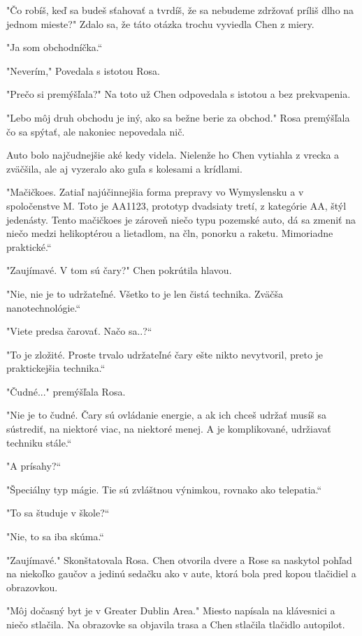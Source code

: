 \documentclass{book}
\begin{document}
"$ $Čo robíš, keď sa budeš sťahovať a tvrdíš, že sa nebudeme zdržovať príliš dlho na jednom mieste?"$ $ Zdalo sa, že táto otázka trochu vyviedla Chen z miery.

"$ $Ja som obchodníčka.“

"$ $Neverím,"$ $ Povedala s istotou Rosa.

"$ $Prečo si premýšľala?"$ $ Na toto už Chen odpovedala s istotou a bez prekvapenia.

"$ $Lebo môj druh obchodu je iný, ako sa bežne berie za obchod."$ $ Rosa premýšľala čo sa spýtať, ale nakoniec nepovedala nič. 

Auto bolo najčudnejšie aké kedy videla. Nielenže ho Chen vytiahla z vrecka a zväčšila, ale aj vyzeralo ako guľa s kolesami a krídlami.

"$ $Mačičkoes. Zatiaľ najúčinnejšia forma prepravy vo Wymyslensku a v spoločenstve M. Toto je AA1123, prototyp dvadsiaty tretí, z kategórie AA, štýl jedenásty. Tento mačičkoes je zároveň niečo typu pozemské auto, dá sa zmeniť na niečo medzi helikoptérou a lietadlom, na čln, ponorku a raketu. Mimoriadne praktické.“

"$ $Zaujímavé. V tom sú čary?"$ $ Chen pokrútila hlavou.

"$ $Nie, nie je to udržateľné. Všetko to je len čistá technika. Zväčša nanotechnológie.“

"$ $Viete predsa čarovať. Načo sa..?“

"$ $To je zložité. Proste trvalo udržateľné čary ešte nikto nevytvoril, preto je praktickejšia technika.“

"$ $Čudné..."$ $ premýšľala Rosa.

"$ $Nie je to čudné. Čary sú ovládanie energie, a ak ich chceš udržať musíš sa sústrediť, na niektoré viac, na niektoré menej. A je komplikované, udržiavať techniku stále.“

"$ $A prísahy?“

"$ $Špeciálny typ mágie. Tie sú zvláštnou výnimkou, rovnako ako telepatia.“

"$ $To sa študuje v škole?“

"$ $Nie, to sa iba skúma.“

"$ $Zaujímavé."$ $ Skonštatovala Rosa. Chen otvorila dvere a Rose sa naskytol pohľad na niekoľko gaučov a jedinú sedačku ako v aute, ktorá bola pred kopou tlačidiel a obrazovkou.

"$ $Môj dočasný byt je v Greater Dublin Area."$ $ Miesto napísala na klávesnici a niečo stlačila. Na obrazovke sa objavila trasa a Chen stlačila tlačidlo autopilot.
\end{document}
